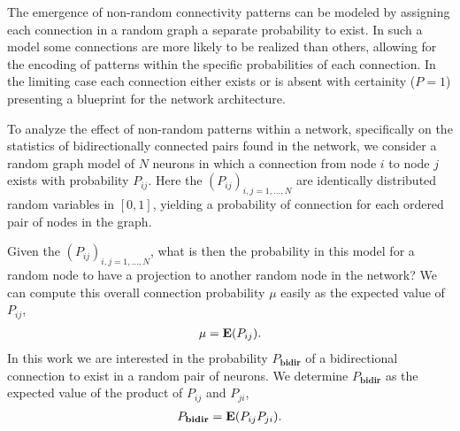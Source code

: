 






The emergence of non-random connectivity patterns can be modeled by assigning each connection in a random graph a separate probability to exist. In such a model some connections are more likely to be realized than others, allowing for the encoding of patterns within the specific probabilities of each connection. In the limiting case each connection either exists or is absent with certainity ($P=1$) presenting a blueprint for the network architecture.

To analyze the effect of non-random patterns within a network, specifically on the statistics of bidirectionally connected pairs found in the network, we consider a random graph model of $N$ neurons in which a connection from node $i$ to node $j$ exists with probability $P_{ij}$. Here the $(P_{ij})_{i,j=1,\dots,N}$ are identically distributed random variables in $[0,1]$, yielding a probability of connection for each ordered pair of nodes in the graph.  

Given the $(P_{ij})_{i,j=1,\dots,N}$, what is then the probability in this model for a random node to have a projection to another random node in the network? We can compute this overall connection probability $\mu$ easily as the expected value of $P_{ij}$,
\begin{align}
\mu = \operatorname{\mathbf{E}}(P_{ij}).
\end{align}
%
%
%
In this work we are interested in the probability $P_{\mathbf{bidir}}$ of a bidirectional connection to exist in a random pair of neurons. We determine $P_{\mathbf{bidir}}$ as the expected value of the product of $P_{ij}$ and $P_{ji}$,
%
\begin{align}
P_{\mathbf{bidir}} = \operatorname{\mathbf{E}}(P_{ij} P_{ji}).
\end{align}
%

